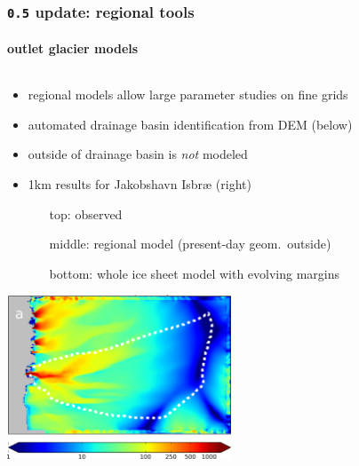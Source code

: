 \documentclass[hide notes,intlimits]{beamer}
\begin{document}
\begin{frame}
  \frametitle{\texttt{0.5} update: regional tools}
  \framesubtitle{outlet glacier models}
  
\begin{columns}
\begin{column}{0.6\textwidth}
\begin{itemize}
\vspace{-5mm}
\small
\item regional models allow large parameter studies on fine grids
\item automated drainage basin identification from DEM (below)
\item outside of drainage basin is \emph{not} modeled
\item 1km results for Jakobshavn Isbr{\ae} (right)
  \begin{itemize}
  \scriptsize
  \item[top:]    observed
  \item[middle:] regional model (present-day geom.~outside)
  \item[bottom:] whole ice sheet model with evolving margins
  \end{itemize}
\end{itemize}

  \begin{center}
  \includegraphics[width=0.5\textwidth]{jako_3km}
  \end{center}
\end{column}


\end{columns}
\end{frame}
\end{document}
